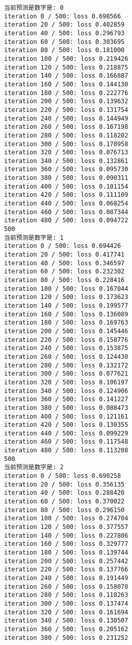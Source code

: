 \documentclass[11pt]{article}
\begin{document}
    \begin{Verbatim}[commandchars=\\\{\}]
当前预测是数字是: 0
iteration 0 / 500: loss 0.698566
iteration 20 / 500: loss 0.402859
iteration 40 / 500: loss 0.296793
iteration 60 / 500: loss 0.303695
iteration 80 / 500: loss 0.181000
iteration 100 / 500: loss 0.219426
iteration 120 / 500: loss 0.218875
iteration 140 / 500: loss 0.166887
iteration 160 / 500: loss 0.144130
iteration 180 / 500: loss 0.222776
iteration 200 / 500: loss 0.139632
iteration 220 / 500: loss 0.131754
iteration 240 / 500: loss 0.144949
iteration 260 / 500: loss 0.167198
iteration 280 / 500: loss 0.118202
iteration 300 / 500: loss 0.170958
iteration 320 / 500: loss 0.076713
iteration 340 / 500: loss 0.132861
iteration 360 / 500: loss 0.095730
iteration 380 / 500: loss 0.090311
iteration 400 / 500: loss 0.101154
iteration 420 / 500: loss 0.111109
iteration 440 / 500: loss 0.068254
iteration 460 / 500: loss 0.087344
iteration 480 / 500: loss 0.094722
500
当前预测是数字是: 1
iteration 0 / 500: loss 0.694426
iteration 20 / 500: loss 0.417741
iteration 40 / 500: loss 0.346597
iteration 60 / 500: loss 0.232302
iteration 80 / 500: loss 0.228416
iteration 100 / 500: loss 0.167044
iteration 120 / 500: loss 0.173623
iteration 140 / 500: loss 0.199577
iteration 160 / 500: loss 0.136089
iteration 180 / 500: loss 0.169763
iteration 200 / 500: loss 0.145446
iteration 220 / 500: loss 0.158776
iteration 240 / 500: loss 0.153875
iteration 260 / 500: loss 0.124430
iteration 280 / 500: loss 0.132172
iteration 300 / 500: loss 0.077621
iteration 320 / 500: loss 0.106197
iteration 340 / 500: loss 0.124906
iteration 360 / 500: loss 0.141227
iteration 380 / 500: loss 0.088473
iteration 400 / 500: loss 0.121161
iteration 420 / 500: loss 0.130355
iteration 440 / 500: loss 0.099229
iteration 460 / 500: loss 0.117548
iteration 480 / 500: loss 0.113208
500
当前预测是数字是: 2
iteration 0 / 500: loss 0.690258
iteration 20 / 500: loss 0.356135
iteration 40 / 500: loss 0.288420
iteration 60 / 500: loss 0.370022
iteration 80 / 500: loss 0.296150
iteration 100 / 500: loss 0.274704
iteration 120 / 500: loss 0.377557
iteration 140 / 500: loss 0.227806
iteration 160 / 500: loss 0.329777
iteration 180 / 500: loss 0.139744
iteration 200 / 500: loss 0.257442
iteration 220 / 500: loss 0.137766
iteration 240 / 500: loss 0.191449
iteration 260 / 500: loss 0.158070
iteration 280 / 500: loss 0.118263
iteration 300 / 500: loss 0.137474
iteration 320 / 500: loss 0.161694
iteration 340 / 500: loss 0.130507
iteration 360 / 500: loss 0.205162
iteration 380 / 500: loss 0.231252

\end{Verbatim}
\end{document}
